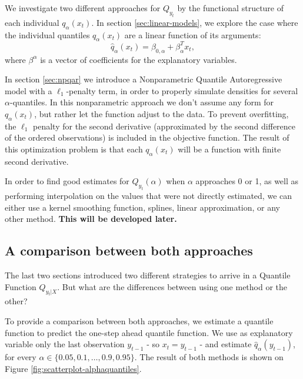 We investigate two different approaches for $Q_{y_t}$ by the functional structure of each individual $q_\alpha(x_t)$.
In section \ref{sec:linear-models}, we explore the case where the individual quantiles $q_\alpha(x_t)$ are a linear function of its arguments:
\begin{equation}
\hat{q}_\alpha(x_t) = \beta_{0,\alpha} +   \beta_\alpha^T x_t,
\label{eq:fun-quantile}
\end{equation}
where $\beta^\alpha$ is a vector of coefficients for the explanatory variables.

In section \ref{sec:npqar} we introduce a Nonparametric Quantile Autoregressive model with a $\ell_{1}$-penalty term, in order to properly simulate densities for several $\alpha$-quantiles. In this nonparametric approach we don't assume any form for $q_\alpha(x_t)$, but rather let the function adjust to the data. To prevent overfitting, the $\ell_1$ penalty for the second derivative (approximated by the second difference of the ordered observations) is included in the objective function. The result of this optimization problem is that each $q_\alpha(x_t)$ will be a function with finite second derivative.

In order to find good estimates for $Q_{y_{t}}(\alpha)$ when $\alpha$ approaches 0 or 1, as well as performing interpolation on the values that were not directly estimated, we can either use a kernel smoothing function, splines, linear approximation, or any other method. 
\textbf{This will be developed later.}







\subsection{A comparison between both approaches}

The last two sections introduced two different strategies to arrive in a Quantile Function $Q_{y_t|X}$. But what are the differences between using one method or the other? 

To provide a comparison between both approaches, we estimate a quantile function to predict the one-step ahead quantile function. We use as explanatory variable only the last observation $y_{t-1}$ - so $x_t = y_{t-1}$ - and estimate $\hat{q}_\alpha(y_{t-1})$, for every $\alpha \in \{0.05, 0.1, \dots, 0.9, 0.95 \}$. The result of both methods is shown on Figure \ref{fig:scatterplot-alphaquantiles}.


